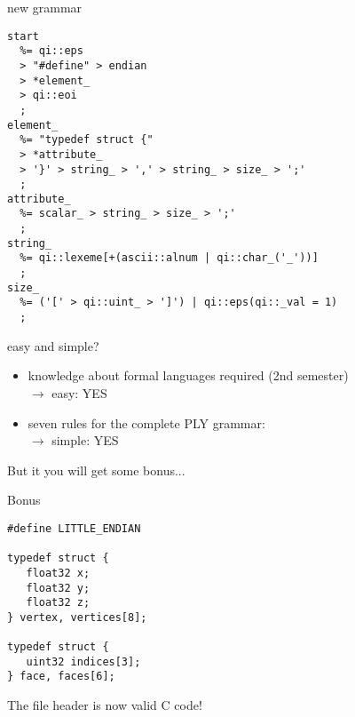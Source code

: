 \documentclass[paper=screen,orient=landscape,style=simple]{powerdot}
\begin{document}
\begin{slide}[method=file]{new grammar}
\linespread{0}
\begin{lstlisting}
start
  %= qi::eps
  > "#define" > endian
  > *element_
  > qi::eoi
  ;
element_
  %= "typedef struct {"
  > *attribute_
  > '}' > string_ > ',' > string_ > size_ > ';'
  ;
attribute_
  %= scalar_ > string_ > size_ > ';'
  ;
string_
  %= qi::lexeme[+(ascii::alnum | qi::char_('_'))]
  ;
size_
  %= ('[' > qi::uint_ > ']') | qi::eps(qi::_val = 1)
  ;
\end{lstlisting}
\end{slide}

\begin{slide}{easy and simple?}
\begin{itemize}
  \item knowledge about formal languages required (2nd semester)\\
        $\rightarrow$ easy: YES
  \item seven rules for the complete PLY grammar:\\
        $\rightarrow$ simple: YES
\end{itemize}

But it you will get some bonus...
\end{slide}

\begin{slide}[method=file]{Bonus}
\begin{lstlisting}
#define LITTLE_ENDIAN
 
typedef struct {
   float32 x;
   float32 y;
   float32 z;
} vertex, vertices[8];
 
typedef struct {
   uint32 indices[3];
} face, faces[6];
\end{lstlisting}

The file header is now valid C code!
\end{slide}
\end{document}
